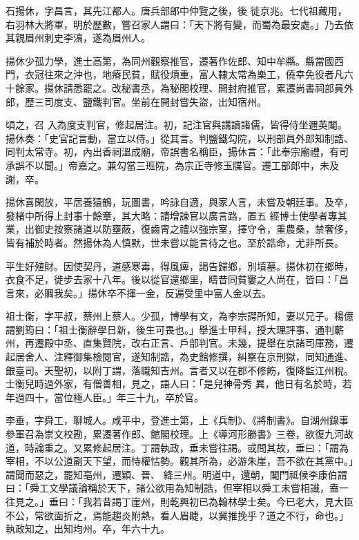 \begin{pinyinscope}
 石揚休，字昌言，其先江都人。唐兵部郎中仲覽之後，後
 徙京兆。七代祖藏用，右羽林大將軍，明於歷數，嘗召家人謂曰：「天下將有變，而蜀為最安處。」乃去依其親眉州刺史李滈，遂為眉州人。



 揚休少孤力學，進士高第，為同州觀察推官，遷著作佐郎、知中牟縣。縣當國西門，衣冠往來之沖也，地瘠民貧，賦役煩重，富人隸太常為樂工，僥幸免役者凡六十餘家。揚休請悉罷之。改秘書丞，為秘閣校理、開封府推官，累遷尚書祠部員外郎，歷三司度支、鹽鐵判官。坐前在開封嘗失盜，出知宿州。



 頃之，召
 入為度支判官，修起居注。初，記注官與講讀諸儒，皆得侍坐邇英閣。揚休奏：「史官記言動，當立以侍。」從其言。判鹽鐵勾院，以刑部員外郎知制誥、同判太常寺。初，內出香祠溫成廟，帝誤書名稱臣，揚休言：「此奉宗廟禮，有司承誤不以聞。」帝嘉之。兼勾當三班院，為宗正寺修玉牒官。遷工部郎中，未及謝，卒。



 揚休喜閑放，平居養猿鶴，玩圖書，吟詠自適，與家人言，未嘗及朝廷事。及卒，發楮中所得上封事十餘章，其大略：請增諫官以廣言路，置五
 經博士使學者專其業，出御史按察諸道以防壅蔽，復齒冑之禮以強宗室，擇守令，重農桑，禁奢侈，皆有補於時者。然揚休為人慎默，世未嘗以能言待之也。至於誥命，尤非所長。



 平生好殖財。因使契丹，道感寒毒，得風痺，謁告歸鄉，別墳墓。揚休初在鄉時，衣食不足，徙步去家十八年。後以從官還鄉里，疇昔同貧窶之人尚在，皆曰：「昌言來，必賙我矣。」揚休卒不揮一金，反遍受里中富人金以去。



 祖士衡，字平叔，蔡州上蔡人。少孤，博學有文，為李宗諤所知，妻以兄子。楊億謂劉筠曰：「祖士衡辭學日新，後生可畏也。」舉進士甲科，授大理評事、通判蘄州，再遷殿中丞、直集賢院，改右正言、戶部判官。未幾，提舉在京諸司庫務，遷起居舍人、注釋御集檢閱官，遂知制誥，為史館修撰，糾察在京刑獄，同知通進、銀臺司。天聖初，以附丁謂，落職知吉州。言者又以在郡不修飭，復降監江州稅。士衡兒時過外家，有僧善相，見之，語人曰：「是兒神骨秀
 異，他日有名於時，若年過四十，當位極人臣。」年三十九，卒於官。



 李垂，字舜工，聊城人。咸平中，登進士第，上《兵制》、《將制書》。自湖州錄事參軍召為崇文校勘，累遷著作郎、館閣校理。上《導河形勝書》三卷，欲復九河故道，時論重之。又累修起居注。丁謂執政，垂未嘗往謁。或問其故，垂曰：「謂為宰相，不以公道副天下望，而恃權怙勢。觀其所為，必游朱崖，吾不欲在其黨中。」謂聞而惡之，罷知亳州，遷穎、晉、
 絳三州。明道中，還朝，閣門祗候李康伯謂曰：「舜工文學議論稱於天下，諸公欲用為知制誥，但宰相以舜工未嘗相識，盍一往見之。」垂曰：「我若昔謁丁崖州，則乾興初已為翰林學士矣。今已老大，見大臣不公，常欲面折之，焉能趨炎附熱，看人眉睫，以冀推挽乎？道之不行，命也。」執政知之，出知均州。卒，年六十九。




\end{pinyinscope}
